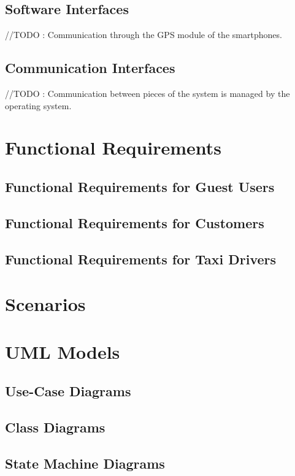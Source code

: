 \documentclass{report}
\begin{document}
		\subsection{Software Interfaces}
		//TODO : Communication through the GPS module of the smartphones.

		\subsection{Communication Interfaces}
		//TODO : Communication between pieces of the system is managed by the operating system.

	\section{Functional Requirements}

		\subsection{Functional Requirements for Guest Users}

		\subsection{Functional Requirements for Customers}

		\subsection{Functional Requirements for Taxi Drivers}


	\section{Scenarios}


	\section{UML Models}

		\subsection{Use-Case Diagrams}

		\subsection{Class Diagrams}

		\subsection{State Machine Diagrams}
\end{document}
